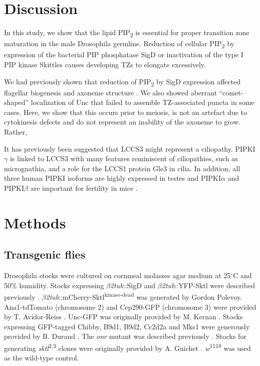 \documentclass[12pt, twoside, letterpaper]{article}
\newcommand{\PIP}{PIP\textsubscript{2}}
\begin{document}
\section{Discussion}

In this study, we show that the lipid \PIP{} is essential for proper
transition zone maturation in the male Drosophila germline.
Reduction of cellular \PIP{} by expression of the bacterial PIP
phosphatase SigD or inactivation of the type I PIP kinase Skittles
causes developing TZs to elongate excessively.


We had previously shown that reduction of \PIP{} by SigD expression
affected flagellar biogenesis and axoneme structure
\citep{wei2008depletion}.
We also showed aberrant ``comet-shaped'' localization of Unc that
failed to assemble TZ-associated puncta in some cases.
Here, we show that this occurs prior to meiosis,
is not an artefact due to cytokinesis defects
and do not represent an inability of the axoneme to grow.
Rather, 



It has previously been suggested that LCCS3 might represent a ciliopathy.
PIPKI$\gamma$ is linked to LCCS3 with many features reminiscent
of ciliopathies, such as micrognathia, and a role for the LCCS1 protein
Gle3 in cilia.
In addition, all three human PIPKI isoforms are highly expressed in testes
and PIPKI$\alpha$ and PIPKI$\beta$ are important for fertility in mice
\citep{hasegawa2012phosphatidylinositol}.




\section{Methods}
\subsection{Transgenic flies}
Drosophila stocks were cultured on cornmeal molasses agar medium at 25$^{\circ}$C
and 50\% humidity.
Stocks expressing $\beta$\textit{2tub}::SigD and $\beta$\textit{2tub}::YFP-Sktl
were described previously \citep{wei2008depletion, fabian2010phosphatidylinositol}.
$\beta$\textit{2tub}::mCherry-Sktl\textsuperscript{kinase-dead}
was generated by Gordon Polevoy.
Ana1-tdTomato (chromosome 2) and Cep290-GFP (chromosome 3) were provided
by T. Avidor-Reiss \citep{basiri2014migrating}.
Unc-GFP was originally provided by M. Kernan \citep{baker2004mechanosensory}.
Stocks expressing GFP-tagged Chibby, B9d1, B9d2, Cc2d2a and Mks1 were generously
provided by B. Durand \citep{enjolras2012drosophila, vieillard2016transition}.
The \textit{onr} mutant was described previously \citep{giansanti2015exocyst}.
Stocks for generating \textit{sktl}\textsuperscript{2.3} clones were originally provided by
A. Guichet \citep{gervais2008pip5k}.
\textit{w}\textsuperscript{1118} was used as the wild-type control.
\end{document}
